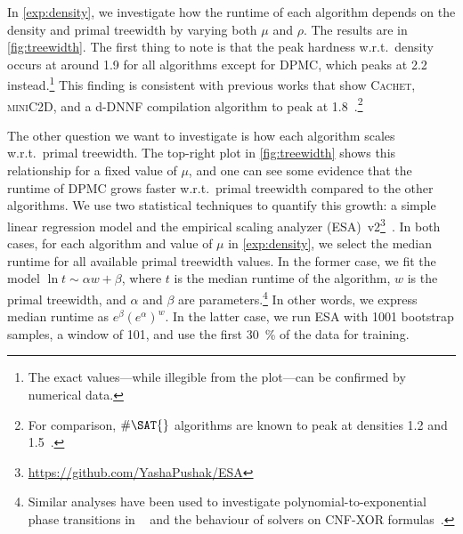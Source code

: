 \documentclass[runningheads]{llncs}
\begin{document}
In \cref{exp:density}, we investigate how the runtime of each algorithm depends
on the density and primal treewidth by varying both $\mu$ and $\rho$. The
results are in \cref{fig:treewidth}. The first thing to note is that the peak
hardness w.r.t.\ density occurs at around 1.9 for all algorithms except for
\textsc{DPMC}, which peaks at 2.2 instead.\footnote{The exact values---while
  illegible from the plot---can be confirmed by numerical data.} This finding is
consistent with previous works that show \textsc{Cachet}, \textsc{miniC2D}, and
a d-DNNF compilation algorithm to peak at
1.8~\cite{DBLP:conf/aaai/Darwiche02,DBLP:conf/cp/GuptaRM20,DBLP:conf/sat/SangBBKP04}.\footnote{For
  comparison, $\#\SAT{}$ algorithms are known to peak at densities 1.2 and
  1.5~\cite{DBLP:conf/aaai/Pehoushek00,DBLP:journals/jair/BirnbaumL99}.}

The other question we want to investigate is how each algorithm scales w.r.t.\
primal treewidth. The top-right plot in \cref{fig:treewidth} shows this
relationship for a fixed value of $\mu$, and one can see some evidence that the
runtime of \textsc{DPMC} grows faster w.r.t.\ primal treewidth compared to the
other algorithms. We use two statistical techniques to quantify this growth: a
simple linear regression model and the empirical scaling analyzer
(ESA)~v2\footnote{\url{https://github.com/YashaPushak/ESA}}~\cite{DBLP:conf/gecco/PushakH20}.
In both cases, for each algorithm and value of $\mu$ in \cref{exp:density}, we
select the median runtime for all available primal treewidth values. In the
former case, we fit the model $\ln t \sim \alpha w + \beta$, where $t$ is the
median runtime of the algorithm, $w$ is the primal treewidth, and $\alpha$ and
$\beta$ are parameters.\footnote{Similar analyses have been used to investigate
  polynomial-to-exponential phase transitions in
  \SAT{}~\cite{DBLP:journals/constraints/CoarfaDASV03} and the behaviour of
  \SAT{} solvers on CNF-XOR formulas~\cite{DBLP:conf/ijcai/DudekMV17}.} In other
words, we express median runtime as $e^\beta{(e^\alpha)}^w$. In the latter case,
we run ESA with 1001 bootstrap samples, a window of 101, and use the first
\SI{30}{\percent} of the data for training.
\end{document}
